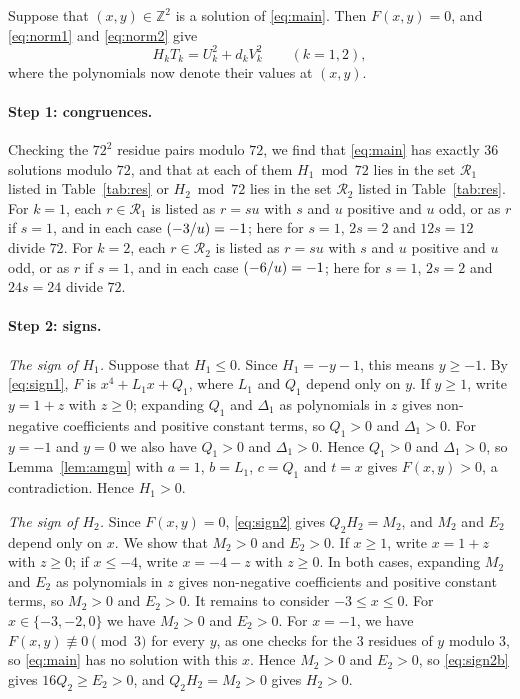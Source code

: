 \documentclass[11pt]{article}
\newcommand{\Z}{\mathbb{Z}}
\newcommand{\leg}[2]{\mathchoice{\biggl(\dfrac{#1}{#2}\biggr)}{(#1/#2)}{(#1/#2)}{(#1/#2)}}
\begin{document}
Suppose that $(x,y)\in\Z^2$ is a solution of \eqref{eq:main}. Then $F(x,y)=0$, and \eqref{eq:norm1} and \eqref{eq:norm2} give
\begin{equation}\label{eq:HT}
H_kT_k=U_k^2+d_kV_k^2\qquad(k=1,2),
\end{equation}
where the polynomials now denote their values at $(x,y)$.

\paragraph{Step 1: congruences.} Checking the $72^2$ residue pairs modulo $72$, we find that \eqref{eq:main} has exactly 36 solutions modulo $72$, and that at each of them $H_{1}\bmod 72$ lies in the set $\mathcal R_{1}$ listed in Table~\ref{tab:res} or $H_{2}\bmod 72$ lies in the set $\mathcal R_{2}$ listed in Table~\ref{tab:res}. For $k=1$, each $r\in\mathcal R_{1}$ is listed as $r=su$ with $s$ and $u$ positive and $u$ odd, or as $r$ if $s=1$, and in each case $\leg{-3}{u}=-1$; here for $s=1$, $2s=2$ and $12s=12$ divide $72$. For $k=2$, each $r\in\mathcal R_{2}$ is listed as $r=su$ with $s$ and $u$ positive and $u$ odd, or as $r$ if $s=1$, and in each case $\leg{-6}{u}=-1$; here for $s=1$, $2s=2$ and $24s=24$ divide $72$.

\paragraph{Step 2: signs.} \emph{The sign of $H_{1}$.} Suppose that $H_{1}\leq0$. Since $H_{1}=-y-1$, this means $y\geq-1$. By \eqref{eq:sign1}, $F$ is $x^4+L_{1}x+Q_{1}$, where $L_{1}$ and $Q_{1}$ depend only on $y$. If $y\geq1$, write $y=1+z$ with $z\geq0$; expanding $Q_{1}$ and $\Delta_{1}$ as polynomials in $z$ gives non-negative coefficients and positive constant terms, so $Q_{1}>0$ and $\Delta_{1}>0$. For $y=-1$ and $y=0$ we also have $Q_{1}>0$ and $\Delta_{1}>0$. Hence $Q_{1}>0$ and $\Delta_{1}>0$, so Lemma~\ref{lem:amgm} with $a=1$, $b=L_{1}$, $c=Q_{1}$ and $t=x$ gives $F(x,y)>0$, a contradiction. Hence $H_{1}>0$.

\emph{The sign of $H_{2}$.} Since $F(x,y)=0$, \eqref{eq:sign2} gives $Q_{2}H_{2}=M_{2}$, and $M_{2}$ and $E_{2}$ depend only on $x$. We show that $M_{2}>0$ and $E_{2}>0$. If $x\geq1$, write $x=1+z$ with $z\geq0$; if $x\leq-4$, write $x=-4-z$ with $z\geq0$. In both cases, expanding $M_{2}$ and $E_{2}$ as polynomials in $z$ gives non-negative coefficients and positive constant terms, so $M_{2}>0$ and $E_{2}>0$. It remains to consider $-3\leq x\leq0$. For $x\in\{-3,-2,0\}$ we have $M_{2}>0$ and $E_{2}>0$. For $x=-1$, we have $F(x,y)\not\equiv0\pmod{3}$ for every $y$, as one checks for the 3 residues of $y$ modulo $3$, so \eqref{eq:main} has no solution with this $x$. Hence $M_{2}>0$ and $E_{2}>0$, so \eqref{eq:sign2b} gives $16Q_{2}\geq E_{2}>0$, and $Q_{2}H_{2}=M_{2}>0$ gives $H_{2}>0$.
\end{document}
